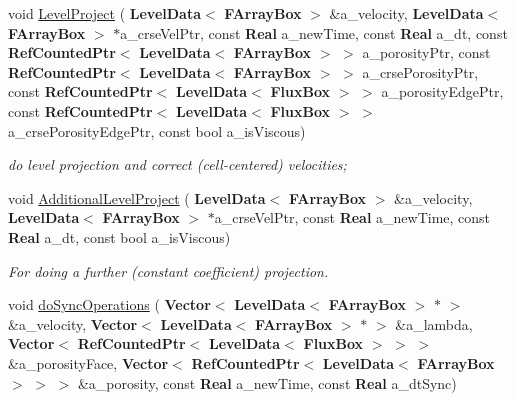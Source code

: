 \begin{DoxyCompactItemize}
\mbox{\label{class_projector_a1a30fbdcd32859f694c6189e9557c552}} 
void \hyperlink{class_projector_a1a30fbdcd32859f694c6189e9557c552}{Level\+Project} (\textbf{ Level\+Data}$<$ \textbf{ F\+Array\+Box} $>$ \&a\+\_\+velocity, \textbf{ Level\+Data}$<$ \textbf{ F\+Array\+Box} $>$ $\ast$a\+\_\+crse\+Vel\+Ptr, const \textbf{ Real} a\+\_\+new\+Time, const \textbf{ Real} a\+\_\+dt, const \textbf{ Ref\+Counted\+Ptr}$<$ \textbf{ Level\+Data}$<$ \textbf{ F\+Array\+Box} $>$ $>$ a\+\_\+porosity\+Ptr, const \textbf{ Ref\+Counted\+Ptr}$<$ \textbf{ Level\+Data}$<$ \textbf{ F\+Array\+Box} $>$ $>$ a\+\_\+crse\+Porosity\+Ptr, const \textbf{ Ref\+Counted\+Ptr}$<$ \textbf{ Level\+Data}$<$ \textbf{ Flux\+Box} $>$ $>$ a\+\_\+porosity\+Edge\+Ptr, const \textbf{ Ref\+Counted\+Ptr}$<$ \textbf{ Level\+Data}$<$ \textbf{ Flux\+Box} $>$ $>$ a\+\_\+crse\+Porosity\+Edge\+Ptr, const bool a\+\_\+is\+Viscous)
\begin{DoxyCompactList}\small\item\em do level projection and correct (cell-\/centered) velocities; \end{DoxyCompactList}\item 
\mbox{\label{class_projector_ac67669184dc9e3af633cda1dfbb83a69}} 
void \hyperlink{class_projector_ac67669184dc9e3af633cda1dfbb83a69}{Additional\+Level\+Project} (\textbf{ Level\+Data}$<$ \textbf{ F\+Array\+Box} $>$ \&a\+\_\+velocity, \textbf{ Level\+Data}$<$ \textbf{ F\+Array\+Box} $>$ $\ast$a\+\_\+crse\+Vel\+Ptr, const \textbf{ Real} a\+\_\+new\+Time, const \textbf{ Real} a\+\_\+dt, const bool a\+\_\+is\+Viscous)
\begin{DoxyCompactList}\small\item\em For doing a further (constant coefficient) projection. \end{DoxyCompactList}\item 
void \hyperlink{class_projector_a0e127be31f7058f463334ba5c40eaef5}{do\+Sync\+Operations} (\textbf{ Vector}$<$ \textbf{ Level\+Data}$<$ \textbf{ F\+Array\+Box} $>$ $\ast$ $>$ \&a\+\_\+velocity, \textbf{ Vector}$<$ \textbf{ Level\+Data}$<$ \textbf{ F\+Array\+Box} $>$ $\ast$ $>$ \&a\+\_\+lambda, \textbf{ Vector}$<$ \textbf{ Ref\+Counted\+Ptr}$<$ \textbf{ Level\+Data}$<$ \textbf{ Flux\+Box} $>$ $>$ $>$ \&a\+\_\+porosity\+Face, \textbf{ Vector}$<$ \textbf{ Ref\+Counted\+Ptr}$<$ \textbf{ Level\+Data}$<$ \textbf{ F\+Array\+Box} $>$ $>$ $>$ \&a\+\_\+porosity, const \textbf{ Real} a\+\_\+new\+Time, const \textbf{ Real} a\+\_\+dt\+Sync)

\end{DoxyCompactItemize}
